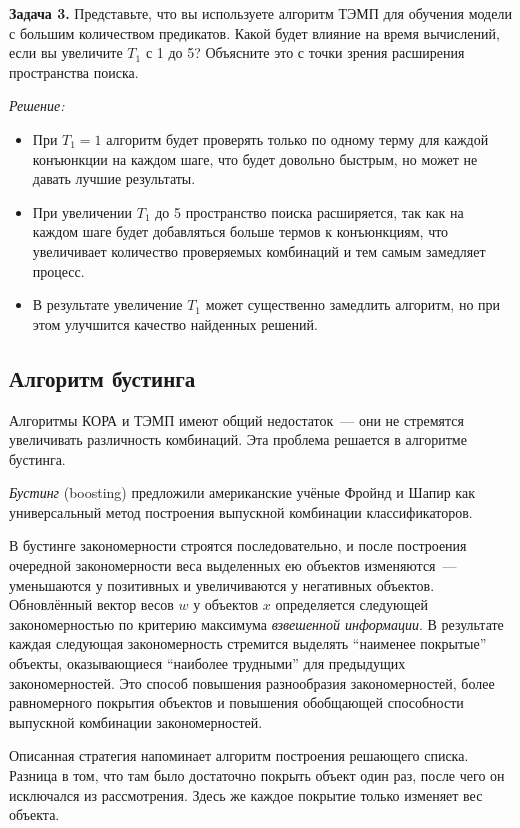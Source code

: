 \textbf{Задача 3.}
\newline
Представьте, что вы используете алгоритм ТЭМП для обучения модели с большим количеством предикатов. Какой будет влияние на время вычислений, если вы увеличите $T_1$ с 1 до 5? Объясните это с точки зрения расширения пространства поиска.

\textit{Решение:}
\begin{itemize}
    \item При $T_1 = 1$ алгоритм будет проверять только по одному терму для каждой конъюнкции на каждом шаге, что будет довольно быстрым, но может не давать лучшие результаты.
    \item При увеличении $T_1$ до 5 пространство поиска расширяется, так как на каждом шаге будет добавляться больше термов к конъюнкциям, что увеличивает количество проверяемых комбинаций и тем самым замедляет процесс.
    \item В результате увеличение $T_1$ может существенно замедлить алгоритм, но при этом улучшится качество найденных решений.
\end{itemize}


\subsection*{Алгоритм бустинга}

Алгоритмы КОРА и ТЭМП имеют общий недостаток~--- они не стремятся увеличивать различность комбинаций. Эта проблема решается в алгоритме бустинга.

\textit{Бустинг} (boosting) предложили американские учёные Фройнд и Шапир как универсальный метод построения выпускной комбинации классификаторов. 

В бустинге закономерности строятся последовательно, и после построения очередной закономерности веса выделенных ею объектов изменяются~--- уменьшаются у позитивных и увеличиваются у негативных объектов. Обновлённый вектор весов $w$ у объектов $x$ определяется следующей закономерностью по критерию максимума \textit{взвешенной информации}. В результате каждая следующая закономерность стремится выделять ``наименее покрытые'' объекты, оказывающиеся ``наиболее трудными'' для предыдущих закономерностей. Это способ повышения разнообразия закономерностей, более равномерного покрытия объектов и повышения обобщающей способности выпускной комбинации закономерностей.

Описанная стратегия напоминает алгоритм построения решающего списка. Разница в том, что там было достаточно покрыть объект один раз, после чего он исключался из рассмотрения. Здесь же каждое покрытие только изменяет вес объекта.

